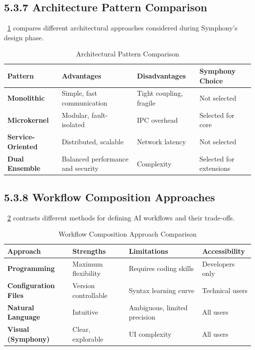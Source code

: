 \subsection*{5.3.7 Architecture Pattern Comparison}

~\ref{tab:architecture-patterns} compares different architectural approaches considered during Symphony's design phase.

\begin{table}[H]
\caption{Architectural Pattern Comparison}
\label{tab:architecture-patterns}
\centering
\small
\begin{tabular}{@{}p{3cm}p{3.5cm}p{3.5cm}p{3.5cm}@{}}
\toprule
\textbf{Pattern} & \textbf{Advantages} & \textbf{Disadvantages} & \textbf{Symphony Choice} \\
\midrule
\textbf{Monolithic} & Simple, fast communication & Tight coupling, fragile & Not selected \\
\midrule
\textbf{Microkernel} & Modular, fault-isolated & IPC overhead & Selected for core \\
\midrule
\textbf{Service-Oriented} & Distributed, scalable & Network latency & Not selected \\
\midrule
\textbf{Dual Ensemble} & Balanced performance and security & Complexity & Selected for extensions \\
\bottomrule
\end{tabular}
\end{table}

\subsection*{5.3.8 Workflow Composition Approaches}

~\ref{tab:workflow-approaches} contrasts different methods for defining AI workflows and their trade-offs.

\begin{table}[H]
\caption{Workflow Composition Approach Comparison}
\label{tab:workflow-approaches}
\centering
\small
\begin{tabular}{@{}p{3.5cm}p{4cm}p{4cm}p{3cm}@{}}
\toprule
\textbf{Approach} & \textbf{Strengths} & \textbf{Limitations} & \textbf{Accessibility} \\
\midrule
\textbf{Programming} & Maximum flexibility & Requires coding skills & Developers only \\
\midrule
\textbf{Configuration Files} & Version controllable & Syntax learning curve & Technical users \\
\midrule
\textbf{Natural Language} & Intuitive & Ambiguous, limited precision & All users \\
\midrule
\textbf{Visual (Symphony)} & Clear, explorable & UI complexity & All users \\
\bottomrule
\end{tabular}
\end{table}
